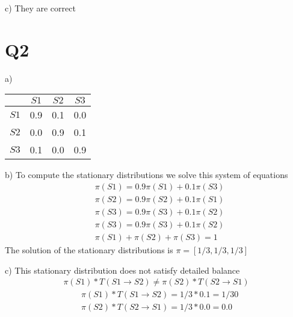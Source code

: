 c) They are correct 

\pagebreak

\section*{Q2}

a)

\begin{tabular}{|c|c|c|c|}
  \hline
    & $S1$ & $S2$ & $S3$ \\
  \hline
  $S1$ & 0.9 & 0.1 & 0.0 \\
  \hline
  $S2$ & 0.0 & 0.9 & 0.1 \\
  \hline
  $S3$ & 0.1 & 0.0 & 0.9 \\
  \hline
\end{tabular}

b) To compute the stationary distributions we solve this system of equations
\begin{align*}
  & \pi(S1) = 0.9\pi(S1) + 0.1\pi(S3)  \\
  & \pi(S2) = 0.9\pi(S2) + 0.1\pi(S1) \\
  & \pi(S3) = 0.9\pi(S3) + 0.1\pi(S2)  \\
  & \pi(S3) = 0.9\pi(S3) + 0.1\pi(S2)  \\
  & \pi(S1) + \pi(S2) + \pi(S3) = 1 
\end{align*}
The solution of the stationary distributions is $\pi = [1/3,1/3,1/3]$

c) This stationary distribution does not satisfy detailed balance
\begin{align*}
  \pi(S1)*T(S1 \to S2) \ne \pi(S2)*T(S2 \to S1)
\end{align*}
\begin{align*}
  &\pi(S1)*T(S1 \to S2) = 1/3*0.1 = 1/30 \\
  &\pi(S2)*T(S2 \to S1) = 1/3*0.0 = 0.0 \\
\end{align*}


\pagebreak